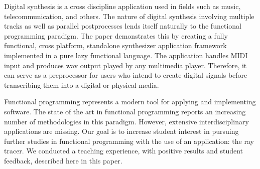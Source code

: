 \documentclass[10pt,a4paper]{altacv}
\begin{document}

\small{Digital synthesis is a cross discipline application used in fields such as music, telecommunication,
and others. The nature of digital synthesis involving multiple tracks as well as parallel postprocesses
lends itself naturally to the functional programming paradigm. The paper demonstrates this by
creating a fully functional, cross platform, standalone synthesizer application framework implemented
in a pure lazy functional language. The application handles MIDI input and produces wav output played
by any multimedia player. Therefore, it can serve as a preprocessor for users who intend to create digital
signals before transcribing them into a digital or physical media.}


\divider

\small{Functional programming represents a modern tool for applying and implementing software. The state
of the art in functional programming reports an increasing number of methodologies in this paradigm.
However, extensive interdisciplinary applications are missing. Our goal is to increase student interest
in pursuing further studies in functional programming with the use of an application: the ray tracer.
We conducted a teaching experience, with positive results and student feedback, described here in
this paper.}

\medskip



\clearpage
\end{document}
